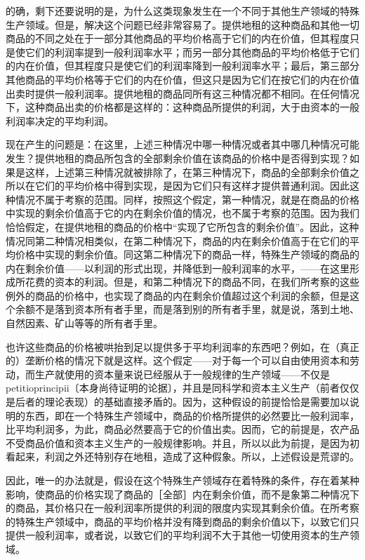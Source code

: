的确，剩下还要说明的是，为什么这类现象发生在一个不同于其他生产领域的特殊生产领域。但是，解决这个问题已经非常容易了。提供地租的这种商品和其他一切商品的不同之处在于一部分其他商品的平均价格高于它们的内在价值，但其程度只是使它们的利润率提到一般利润率水平；而另一部分其他商品的平均价格低于它们的内在价值，但其程度只是使它们的利润率降到一般利润率水平；最后，第三部分其他商品的平均价格等于它们的内在价值，但这只是因为它们在按它们的内在价值出卖时提供一般利润率。提供地租的商品同所有这三种情况都不相同。在任何情况下，这种商品出卖的价格都是这样的：这种商品所提供的利润，大于由资本的一般利润率决定的平均利润。

现在产生的问题是：在这里，上述三种情况中哪一种情况或者其中哪几种情况可能发生？提供地租的商品所包含的全部剩余价值在该商品的价格中是否得到实现？如果是这样，上述第三种情况就被排除了，在第三种情况下，商品的全部剩余价值之所以在它们的平均价格中得到实现，是因为它们只有这样才提供普通利润。因此这种情况不属于考察的范围。同样，按照这个假定，第一种情况，就是在商品的价格中实现的剩余价值高于它的内在剩余价值的情况，也不属于考察的范围。因为我们恰恰假定，在提供地租的商品的价格中“实现了它所包含的剩余价值”。因此，这种情况同第二种情况相类似，在第二种情况下，商品的内在剩余价值高于在它们的平均价格中实现的剩余价值。同这第二种情况下的商品一样，特殊生产领域的商品的内在剩余价值——以利润的形式出现，并降低到一般利润率的水平，——在这里形成所花费的资本的利润。但是，和第二种情况下的商品不同，在我们所考察的这些例外的商品的价格中，也实现了商品的内在剩余价值超过这个利润的余额，但是这个余额不是落到资本所有者手里，而是落到别的所有者手里，就是说，落到土地、自然因素、矿山等等的所有者手里。

也许这些商品的价格被哄抬到足以提供多于平均利润率的东西吧？例如，在（真正的）垄断价格的情况下就是这样。这个假定——对于每一个可以自由使用资本和劳动，而生产就使用的资本量来说已经服从于一般规律的生产领域——不仅是petitioprincipii〔本身尚待证明的论据〕，并且是同科学和资本主义生产（前者仅仅是后者的理论表现）的基础直接矛盾的。因为，这种假设的前提恰恰是需要加以说明的东西，即在一个特殊生产领域中，商品的价格所提供的必然要比一般利润率，比平均利润多，为此，商品必然要高于它的价值出卖。因而，它的前提是，农产品不受商品价值和资本主义生产的一般规律影响。并且，所以以此为前提，是因为初看起来，利润之外还特别存在地租，造成了这种假象。所以，上述假设是荒谬的。

因此，唯一的办法就是，假设在这个特殊生产领域存在着特殊的条件，存在着某种影响，使商品的价格实现了商品的［全部］内在剩余价值，而不是象第二种情况下的商品，其价格只在一般利润率所提供的利润的限度内实现其剩余价值。在所考察的特殊生产领域中，商品的平均价格并没有降到商品的剩余价值以下，以致它们只提供一般利润率，或者说，以致它们的平均利润不大于其他一切使用资本的生产领域。

